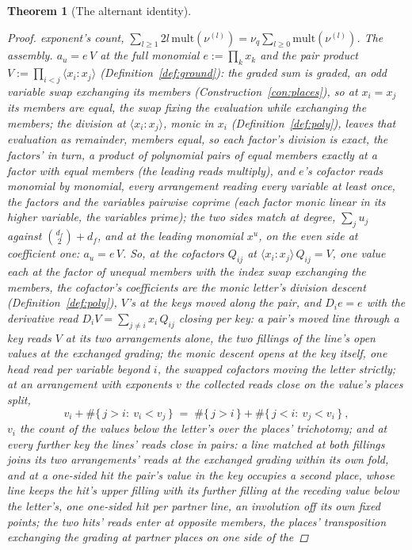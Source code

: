 \documentclass[11pt]{article}
\newtheorem{theorem}{Theorem}
\theoremstyle{definition}
\begin{document}
\begin{theorem}[The alternant identity]
\begin{proof}
exponent's count,
$\sum_{l\ge1}2l\,\mathrm{mult}(\nu^{(l)})
=\nu_q\sum_{l\ge0}\mathrm{mult}(\nu^{(l)})$.
\emph{The assembly.} $a_u=e\,V$ at the full monomial
$e:=\prod_kx_k$ and the pair product
$V:=\prod_{i<j}\langle x_i\!:\!x_j\rangle$
(Definition~\ref{def:ground}): the graded sum is
graded, an odd variable swap exchanging its members
(Construction~\ref{con:places}), so at $x_i=x_j$ its members are
equal, the
swap fixing the evaluation while exchanging the members; the
division at $\langle x_i\!:\!x_j\rangle$, monic in $x_i$
(Definition~\ref{def:poly}), leaves that evaluation as remainder,
members equal, so each factor's division is exact, the factors' in
turn, a product of polynomial pairs of equal members exactly at a
factor with equal members (the leading reads multiply), and $e$'s
cofactor reads monomial by monomial, every arrangement reading every
variable at least once, the factors and the variables pairwise
coprime (each factor monic linear in its higher variable, the
variables prime); the two sides
match at degree, $\sum_ju_j$ against $\binom{d_f}2+d_f$,
and at the leading monomial $x^{u}$, on the even side at
coefficient one: $a_u=e\,V$. So, at the cofactors $Q_{ij}$ at
$\langle x_i\!:\!x_j\rangle\,Q_{ij}=V$, one value each at the
factor of unequal members with the index swap exchanging the members,
the cofactor's coefficients are the monic letter's division descent
(Definition~\ref{def:poly}), $V$'s at the keys moved along the pair,
and $D_ie=e$ with the derivative read
$D_iV=\sum_{j\ne i}x_i\,Q_{ij}$ closing per key: a pair's moved
line through a key reads $V$ at its two arrangements alone, the two
fillings of the line's open values at the exchanged grading; the
monic descent opens at the key itself, one head read per variable
beyond $i$, the swapped cofactors moving the letter strictly; at an
arrangement with exponents $v$ the collected reads close on the
value's places split,
\[
v_i+\#\{\,j>i:\ v_i<v_j\,\}
\;=\;\#\{\,j>i\,\}+\#\{\,j<i:\ v_j<v_i\,\}\ ,
\]
$v_i$ the count of the values below the letter's over the places'
trichotomy; and at every further key the lines' reads close in
pairs: a line matched at both fillings joins its two arrangements'
reads at the exchanged grading within its own fold, and at a
one-sided hit the pair's value in the key occupies a second place,
whose line keeps the hit's upper filling with its further filling
at the receding value below the letter's, one one-sided hit per
partner line, an involution off its own fixed points; the two
hits' reads enter at opposite members, the places' transposition
exchanging the grading at partner places on one side of the

\end{proof}
\end{theorem}
\end{document}
